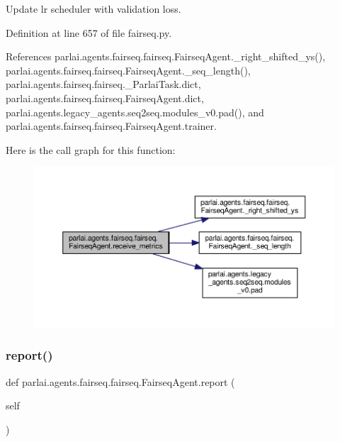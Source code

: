 \begin{DoxyVerb}Update lr scheduler with validation loss.\end{DoxyVerb}
 

Definition at line 657 of file fairseq.\+py.



References parlai.\+agents.\+fairseq.\+fairseq.\+Fairseq\+Agent.\+\_\+right\+\_\+shifted\+\_\+ys(), parlai.\+agents.\+fairseq.\+fairseq.\+Fairseq\+Agent.\+\_\+seq\+\_\+length(), parlai.\+agents.\+fairseq.\+fairseq.\+\_\+\+Parlai\+Task.\+dict, parlai.\+agents.\+fairseq.\+fairseq.\+Fairseq\+Agent.\+dict, parlai.\+agents.\+legacy\+\_\+agents.\+seq2seq.\+modules\+\_\+v0.\+pad(), and parlai.\+agents.\+fairseq.\+fairseq.\+Fairseq\+Agent.\+trainer.

Here is the call graph for this function\+:
\nopagebreak
\begin{figure}[H]
\begin{center}
\leavevmode
\includegraphics[width=350pt]{classparlai_1_1agents_1_1fairseq_1_1fairseq_1_1FairseqAgent_a29521783f42e437063f9d861133965b0_cgraph}
\end{center}
\end{figure}
\mbox{\label{classparlai_1_1agents_1_1fairseq_1_1fairseq_1_1FairseqAgent_af7629e9695ec1f9e0f7368095a41b69c}} 
\subsubsection{\texorpdfstring{report()}{report()}}
{\footnotesize\ttfamily def parlai.\+agents.\+fairseq.\+fairseq.\+Fairseq\+Agent.\+report (\begin{DoxyParamCaption}\item[{}]{self }\end{DoxyParamCaption})}


